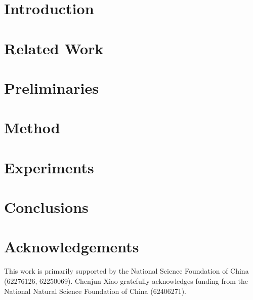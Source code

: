 \documentclass{article}
\theoremstyle{plain}
\theoremstyle{definition}
\theoremstyle{remark}
\begin{document}

\printAffiliationsAndNotice{}  %

\begin{abstract}

\end{abstract}

\section{Introduction}\label{sec:intro}


\section{Related Work}\label{sec:related_work}


\section{Preliminaries}\label{sec:preliminary}


\section{Method}\label{sec:method}



\section{Experiments}\label{sec:experiments}


\vspace{-2mm}
\section{Conclusions}\label{sec:conclusions}


\newpage
\section*{Acknowledgements}
This work is primarily supported by the National Science Foundation of China (62276126, 62250069). Chenjun Xiao gratefully acknowledges funding from the National Natural Science Foundation of China (62406271). 
\end{document}
